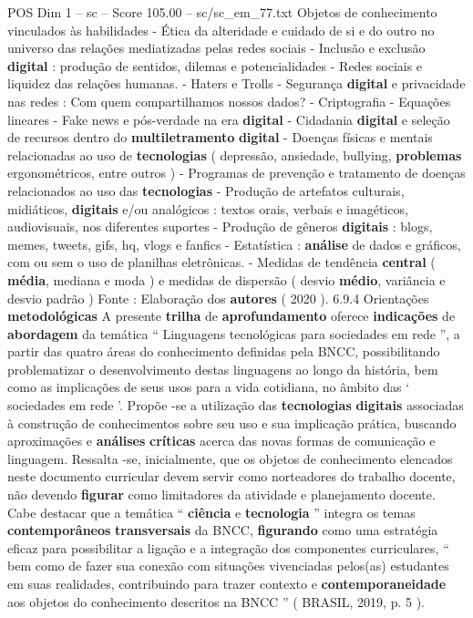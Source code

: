 \begin{textsample}{POS Dim 1 – sc – Score 105.00 – sc/sc\_em\_77.txt}
Objetos de conhecimento vinculados às habilidades - Ética da alteridade e cuidado de si e do outro no universo das relações mediatizadas pelas redes sociais - Inclusão e exclusão \textbf{digital} : produção de sentidos, dilemas e potencialidades - Redes sociais e liquidez das relações humanas. - Haters e Trolls - Segurança \textbf{digital} e privacidade nas redes : Com quem compartilhamos nossos dados? - Criptografia - Equações lineares - Fake news e pós-verdade na era \textbf{digital} - Cidadania \textbf{digital} e seleção de recursos dentro do \textbf{multiletramento} \textbf{digital} - Doenças físicas e mentais relacionadas ao uso de \textbf{tecnologias} ( depressão, ansiedade, bullying, \textbf{problemas} ergonométricos, entre outros ) - Programas de prevenção e tratamento de doenças relacionados ao uso das \textbf{tecnologias} - Produção de artefatos culturais, midiáticos, \textbf{digitais} e/ou analógicos : textos orais, verbais e imagéticos, audiovisuais, nos diferentes suportes - Produção de gêneros \textbf{digitais} : blogs, memes, tweets, gifs, hq, vlogs e fanfics - Estatística : \textbf{análise} de dados e gráficos, com ou sem o uso de planilhas eletrônicas. - Medidas de tendência \textbf{central} ( \textbf{média}, mediana e moda ) e medidas de dispersão ( desvio \textbf{médio}, variância e desvio padrão ) Fonte : Elaboração dos \textbf{autores} ( 2020 ). 6.9.4 Orientações \textbf{metodológicas} A presente \textbf{trilha} de \textbf{aprofundamento} oferece \textbf{indicações} de \textbf{abordagem} da temática “ Linguagens tecnológicas para sociedades em rede ”, a partir das quatro áreas do conhecimento definidas pela BNCC, possibilitando problematizar o desenvolvimento destas linguagens ao longo da história, bem como as implicações de seus usos para a vida cotidiana, no âmbito das ‘ sociedades em rede ’.
Propõe -se a utilização das \textbf{tecnologias} \textbf{digitais} associadas à construção de conhecimentos sobre seu uso e sua implicação prática, buscando aproximações e \textbf{análises} \textbf{críticas} acerca das novas formas de comunicação e linguagem.
Ressalta -se, inicialmente, que os objetos de conhecimento elencados neste documento curricular devem servir como norteadores do trabalho docente, não devendo \textbf{figurar} como limitadores da atividade e planejamento docente.
Cabe destacar que a temática “ \textbf{ciência} e \textbf{tecnologia} ” integra os temas \textbf{contemporâneos} \textbf{transversais} da BNCC, \textbf{figurando} como uma estratégia eficaz para possibilitar a ligação e a integração dos componentes curriculares, “ bem como de fazer sua conexão com situações vivenciadas pelos(as) estudantes em suas realidades, contribuindo para trazer contexto e \textbf{contemporaneidade} aos objetos do conhecimento descritos na BNCC ” ( BRASIL, 2019, p. 5 ).

\end{textsample}
